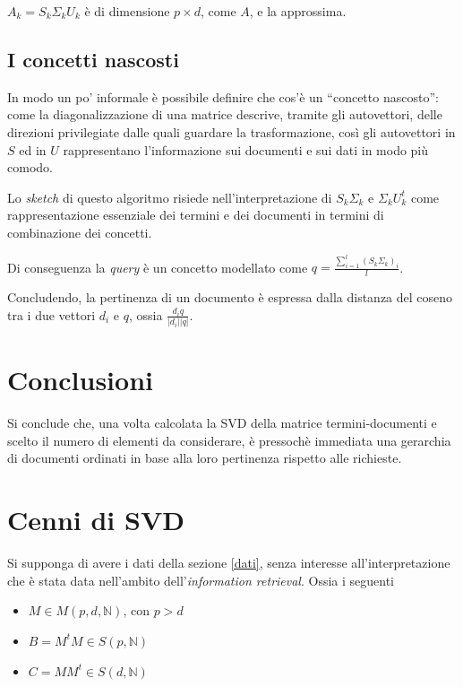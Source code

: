 \documentclass[12pt,a4paper]{article}
\theoremstyle{thm}
\theoremstyle{def}
\begin{document}
$A_k = S_k \Sigma_k U_k$ è di dimensione $p \times d$, come $A$, e la approssima.



\subsection{I concetti nascosti}
In modo un po' informale è possibile definire che cos'è un ``concetto nascosto'': come la diagonalizzazione di una matrice descrive, tramite gli autovettori, delle direzioni privilegiate dalle quali guardare la trasformazione, così gli autovettori in $S$ ed in $U$ rappresentano l'informazione sui documenti e  sui dati in modo più comodo.

Lo \textit{sketch} di questo algoritmo risiede nell'interpretazione di $S_k \Sigma_ k$ e $\Sigma_k U_k^t$ come rappresentazione essenziale dei termini e dei documenti in termini di combinazione dei concetti.

Di conseguenza la \textit{query} è un concetto modellato come $q= \frac{\sum\limits_{i=1}^l (S_k \Sigma_k)_i}{l}$.

Concludendo, la pertinenza di un documento è espressa dalla distanza del coseno tra i due vettori $d_i$ e $q$, ossia $\frac{d_i q}{|d_i||q|}$.



\section{Conclusioni}
Si conclude che, una volta calcolata la SVD della matrice termini-documenti e scelto il numero di elementi da considerare, è pressochè immediata una gerarchia di documenti ordinati in base alla loro pertinenza rispetto alle richieste.


\newpage
\appendix

\section{Cenni di SVD}
\label{appendice}
Si supponga di avere i dati della sezione \ref{dati}, senza interesse all'interpretazione che è stata data nell'ambito dell'\textit{information retrieval}. Ossia i seguenti
\begin{itemize}
\item $M \in M(p,d,\mathds{N})$, con $p > d$
\item $B=M^tM \in S(p, \mathds{N})$
\item $C=MM^t \in S(d, \mathds{N})$
\end{itemize}
\end{document}
